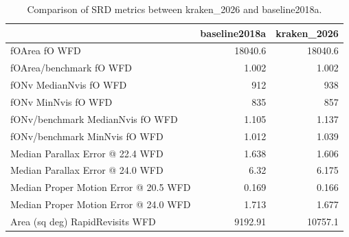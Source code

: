 \documentclass[DM,authoryear,toc]{lsstdoc}
\begin{document}
\begin{table}[htp]
\caption{Comparison of SRD metrics between kraken\_2026 and baseline2018a.}
\begin{center}
\small
\begin{tabular}{lrr}
\toprule
{}                                                                                       &   baseline2018a &   kraken\_2026 \\
\midrule
 fOArea fO WFD                                           &       18040.6       &     18040.6   \\
 fOArea/benchmark fO WFD                        &           1.002       &         1.002 \\
 fONv MedianNvis fO WFD                          &         912            &       938     \\
 fONv MinNvis fO WFD                                &         835            &       857     \\
 fONv/benchmark MedianNvis fO WFD       &           1.105       &         1.137 \\
 fONv/benchmark MinNvis fO WFD             &           1.012       &         1.039 \\
 Median Parallax Error @ 22.4 WFD                               &           1.638       &         1.606 \\
 Median Parallax Error @ 24.0 WFD                               &           6.32         &        6.175 \\
 Median Proper Motion Error @ 20.5 WFD                     &          0.169        &        0.166 \\
 Median Proper Motion Error @ 24.0 WFD                     &           1.713       &         1.677 \\
  Area (sq deg) RapidRevisits WFD                                &     9192.91        &       10757.1 \\
\bottomrule
\end{tabular}
\end{center}
\label{tab:srd-comparison}
\end{table}
\end{document}
